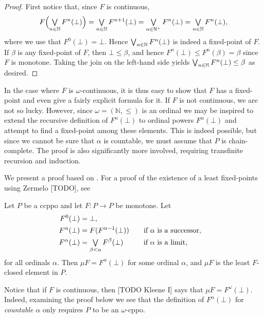 \documentclass[a4paper, 11pt, article, danish, oneside]{memoir}
\newcommand{\naturals}{\mathbb{N}}
\DeclareMathOperator*{\smallbigvee}{\textstyle\bigvee}
\DeclareMathOperator*{\bigjoin}{\mathchoice
    {\smallbigvee}%
    {\bigvee}%
    {\bigvee}%
    {\bigvee}%
}
\begin{document}
\begin{proof}
    First notice that, since $F$ is continuous,
    \begin{equation*}
        F \Bigl( \bigjoin_{n \in \naturals} F^n(\bot) \Bigr)
            = \bigjoin_{n \in \naturals} F^{n+1}(\bot)
            = \bigjoin_{n \in \naturals^+} F^n(\bot)
            = \bigjoin_{n \in \naturals} F^n(\bot),
    \end{equation*}
    where we use that $F^0(\bot) = \bot$. Hence $\bigjoin_{n \in \naturals} F^n(\bot)$ is indeed a fixed-point of $F$. If $\beta$ is any fixed-point of $F$, then $\bot \leq \beta$, and hence $F^n(\bot) \leq F^n(\beta) = \beta$ since $F$ is monotone. Taking the join on the left-hand side yields $\bigjoin_{n \in \naturals} F^n(\bot) \leq \beta$ as desired.
\end{proof}
%
In the case where $F$ is $\omega$-continuous, it is thus easy to show that $F$ has a fixed-point and even give a fairly explicit formula for it. If $F$ is not continuous, we are not so lucky. However, since $\omega = (\naturals,\leq)$ is an ordinal we may be inspired to extend the recursive definition of $F^n(\bot)$ to ordinal powers $F^\alpha(\bot)$ and attempt to find a fixed-point among these elements. This is indeed possible, but since we cannot be sure that $\alpha$ is countable, we must assume that $P$ is chain-complete. The proof is also significantly more involved, requiring transfinite recursion and induction.

We present a proof based on \textcite[Exercise~8.19]{davey-priestley-order}. For a proof of the existence of a least fixed-points using Zermelo [TODO], see \textcite[Theorem~7.36]{moschovakis-set-theory}

\begin{theorem}
    Let $P$ be a ccppo and let $F \colon P \to P$ be monotone. Let
    \begin{alignat*}{2}
        F^0(\bot)
            &= \bot, \\
        F^\alpha(\bot)
            &= F(F^{\alpha-1}(\bot))
            \quad &&\text{if $\alpha$ is a successor}, \\
        F^\alpha(\bot)
            &= \bigjoin_{\beta < \alpha} F^\beta(\bot)
            \quad &&\text{if $\alpha$ is a limit},
    \end{alignat*}
    for all ordinals $\alpha$. Then $\mu F = F^\alpha(\bot)$ for some ordinal $\alpha$, and $\mu F$ is the least $F$-closed element in $P$.
\end{theorem}
%
Notice that if $F$ is continuous, then [TODO Kleene I] says that $\mu F = F^\omega(\bot)$. Indeed, examining the proof below we see that the definition of $F^\alpha(\bot)$ for \emph{countable} $\alpha$ only requires $P$ to be an $\omega$-cppo.
\end{document}
